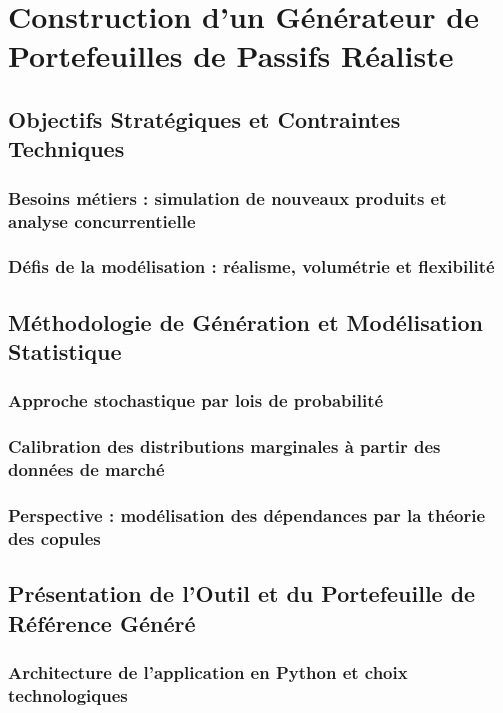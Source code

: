 \chapter{Construction d'un Générateur de Portefeuilles de Passifs Réaliste}

\section{Objectifs Stratégiques et Contraintes Techniques}
    \subsection{Besoins métiers : simulation de nouveaux produits et analyse concurrentielle}
    \subsection{Défis de la modélisation : réalisme, volumétrie et flexibilité}

\section{Méthodologie de Génération et Modélisation Statistique}
    \subsection{Approche stochastique par lois de probabilité}
    \subsection{Calibration des distributions marginales à partir des données de marché}
    \subsection{Perspective : modélisation des dépendances par la théorie des copules}

\section{Présentation de l'Outil et du Portefeuille de Référence Généré}
    \subsection{Architecture de l'application en Python et choix technologiques}
